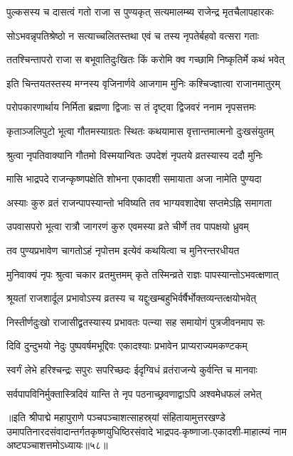 \twolineshloka
{पुल्कसस्य च दासत्वं गतो राजा स पुण्यकृत्}
{सत्यमालम्ब्य राजेन्द्र मृतचैलापहारकः}%

\twolineshloka
{सोऽभवन्नृपतिश्रेष्ठो न सत्याच्चलितस्तथा}
{एवं च तस्य नृपतेर्बहवो वत्सरा गताः}%

\twolineshloka
{ततश्चिन्तापरो राजा स बभूवातिदुःखितः}
{किं करोमि क्व गच्छामि निष्कृतिर्मे कथं भवेत्}%

\twolineshloka
{इति चिन्तयतस्तस्य मग्नस्य वृजिनार्णवे}
{आजगाम मुनिः कश्चिज्ज्ञात्वा राजानमातुरम्}%

\twolineshloka
{परोपकारणार्थाय निर्मिता ब्रह्मणा द्विजाः}
{स तं दृष्ट्वा द्विजवरं ननाम नृपसत्तमः}%

\twolineshloka
{कृताञ्जलिपुटो भूत्वा गौतमस्याग्रतः स्थितः}
{कथयामास वृत्तान्तमात्मनो दुःखसंयुतम्}%

\twolineshloka
{श्रुत्वा नृपतिवाक्यानि गौतमो विस्मयान्वितः}
{उपदेशं नृपतये व्रतस्यास्य ददौ मुनिः}%

\twolineshloka
{मासि भाद्रपदे राजन्कृष्णपक्षेति शोभना}
{एकादशी समायाता  अजा नामेति पुण्यदा}%

\twolineshloka
{अस्याः कुरु व्रतं राजन्पापस्यान्तो भविष्यति}
{तव भाग्यवशादेषा सप्तमेऽह्नि समागता}%

\twolineshloka
{उपवासपरो भूत्वा रात्रौ जागरणं कुरु}
{एवमस्या व्रते चीर्णे तव पापक्षयो ध्रुवम्}%

\twolineshloka
{तव पुण्यप्रभावेण चागतोऽहं नृपोत्तम}
{इत्येवं कथयित्वा च मुनिरन्तरधीयत}%

\twolineshloka
{मुनिवाक्यं नृपः श्रुत्वा चकार व्रतमुत्तमम्}
{कृते तस्मिन्व्रते राज्ञः पापस्यान्तोऽभवत्क्षणात्}%

\twolineshloka
{श्रूयतां राजशार्दूल प्रभावोऽस्य व्रतस्य च}
{यद्दुःखम्बहुभिर्वर्षैर्भोक्तव्यन्तत्क्षयोभवेत्}%

\twolineshloka
{निस्तीर्णदुःखो राजासीद्व्रतस्यास्य प्रभावतः}
{पत्न्या सह समायोगं पुत्रजीवनमाप सः}%

\twolineshloka
{दिवि दुन्दुभयो नेदुः पुष्पवर्षमभूद्दिवः}
{एकादश्याः प्रभावेन प्राप्यराज्यमकण्टकम्}%

\twolineshloka
{स्वर्गं लेभे हरिश्चन्द्रः सपुरः सपरिच्छदः}
{ईदृग्विधं व्रतंराजन्ये कुर्वन्ति च मानवाः}%

\twolineshloka
{सर्वपापविनिर्मुक्तास्त्रिदिवं यान्ति ते नृप}
{पठनाच्छ्रवणाद्वाऽपि अश्वमेधफलं लभेत्}%

॥इति श्रीपाद्मे महापुराणे पञ्चपञ्चाशत्साहस्र्यां संहितायामुत्तरखण्डे उमापतिनारदसंवादान्तर्गतकृष्णयुधिष्ठिरसंवादे भाद्रपद-कृष्णाजा-एकादशी-माहात्म्यं नाम अष्टपञ्चाशत्तमोऽध्यायः॥५८॥


